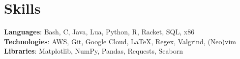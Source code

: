 \documentclass[letterpaper,11pt]{article}
\begin{document}
\section{Skills}
 \begin{itemize}[leftmargin=0.15in, label={}]
    \small{\item{
     \textbf{Languages}{: Bash, C, Java, Lua, Python, R, Racket, SQL, x86} \\
     \textbf{Technologies}{: AWS, Git, Google Cloud, \LaTeX, Regex, Valgrind, (Neo)vim} \\
     \textbf{Libraries}{: Matplotlib, NumPy, Pandas, Requests, Seaborn} \\
    }}
 \end{itemize}
\end{document}
